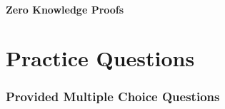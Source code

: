 \documentclass[12pt]{article}
\begin{document}
\hypertarget{zero-knowledge-proofs}{%
\subsection{Zero Knowledge Proofs}\label{zero-knowledge-proofs}}

\part{Practice Questions}

\hypertarget{provided-multiple-choice-questions}{%
\section{Provided Multiple Choice
Questions}\label{provided-multiple-choice-questions}}
\end{document}
